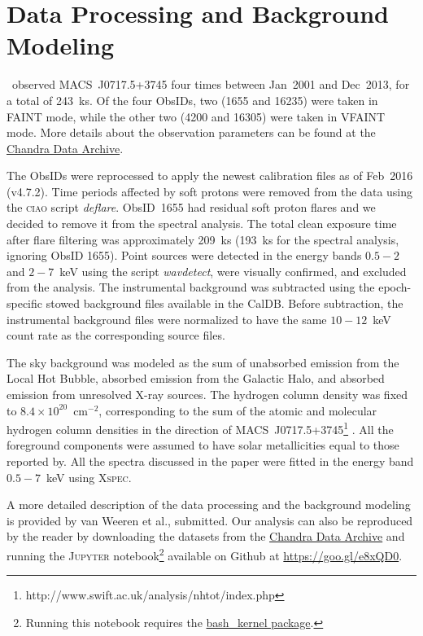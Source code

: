 \section{Data Processing and Background Modeling}
\label{sec:DataAnalysis}

\chandra\ observed MACS~J0717.5+3745 four times between Jan~2001 and Dec~2013, for a total of 243~ks. Of the four ObsIDs, two (1655 and 16235) were taken in FAINT mode, while the other two (4200 and 16305) were taken in VFAINT mode. More details about the observation parameters can be found at the \href{http://cda.harvard.edu/chaser/}{Chandra Data Archive}.

The ObsIDs were reprocessed to apply the newest calibration files as of Feb~2016 (v4.7.2). Time periods affected by soft protons were removed from the data using the \textsc{ciao} script \emph{deflare}. ObsID~1655 had residual soft proton flares and we decided to remove it from the spectral analysis. The total clean exposure time after flare filtering was approximately 209~ks (193~ks for the spectral analysis, ignoring ObsID 1655). Point sources were detected in the energy bands $0.5-2$ and $2-7$~keV using the script \emph{wavdetect}, were visually confirmed, and excluded from the analysis. The instrumental background was subtracted using the epoch-specific stowed background files available in the CalDB. Before subtraction, the instrumental background files were normalized to have the same $10-12$~keV count rate as the corresponding source files. 

The sky background was modeled as the sum of unabsorbed emission from the Local Hot Bubble, absorbed emission from the Galactic Halo, and absorbed emission from unresolved X-ray sources. The hydrogen column density was fixed to $8.4\times 10^{20}$~cm$^{-2}$, corresponding to the sum of the atomic and molecular hydrogen column densities in the direction of MACS~J0717.5+3745\footnote{http://www.swift.ac.uk/analysis/nhtot/index.php} \citep{Kalberla2005, Willingale2013}. All the foreground components were assumed to have solar metallicities equal to those reported by\citet{Feldman1992}. All the spectra discussed in the paper were fitted in the energy band $0.5-7$~keV using \textsc{Xspec}.

A more detailed description of the data processing and the background modeling is provided by van Weeren et al., submitted. Our analysis can also be reproduced by the reader by downloading the datasets from the \href{http://cda.harvard.edu/chaser/}{Chandra Data Archive} and running the \textsc{Jupyter} notebook\footnote{Running this notebook requires the \href{https://github.com/takluyver/bash\_kernel}{bash\_kernel package}.} available on Github at \url{https://goo.gl/e8xQD0}. 
